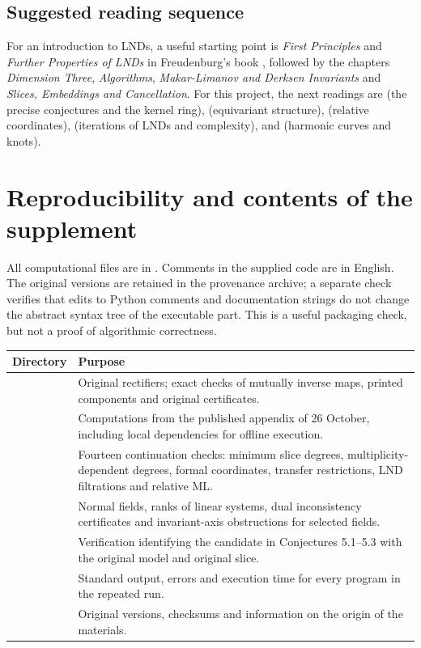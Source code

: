 \subsection*{Suggested reading sequence}
For an introduction to LNDs, a useful starting point is \emph{First Principles}
and \emph{Further Properties of LNDs} in Freudenburg's book \cite{Freudenburg},
followed by the chapters \emph{Dimension Three}, \emph{Algorithms},
\emph{Makar-Limanov and Derksen Invariants} and
\emph{Slices, Embeddings and Cancellation}. For this project,
the next readings are \cite{vdER} (the precise conjectures and the kernel ring),
\cite{Masuda} (equivariant structure), \cite{EVM} (relative
coordinates), \cite{DG} (iterations of LNDs and complexity),
and \cite{FF,KP} (harmonic curves and knots).

\section{Reproducibility and contents of the supplement}

All computational files are in .
Comments in the supplied code are in English. The original
versions are retained in the provenance archive; a separate check verifies
that edits to Python comments and documentation strings do not change
the abstract syntax tree of the executable part.
This is a useful packaging check, but not a proof of algorithmic correctness.

\begin{longtable}{L{0.29\textwidth}L{0.65\textwidth}}
\toprule Directory & Purpose \\ \midrule
\endhead
{} & Original rectifiers; exact checks of mutually inverse
maps, printed components and original certificates.\\[5pt]
 & Computations from the published appendix
of 26 October, including local dependencies for offline execution.\\[5pt]
 & Fourteen continuation checks: minimum slice
degrees, multiplicity-dependent degrees, formal coordinates, transfer
restrictions, LND filtrations and relative ML.\\[5pt]
 & Normal fields, ranks of linear systems, dual
inconsistency certificates and invariant-axis obstructions for selected fields.\\[5pt]
 & Verification identifying the candidate in
Conjectures 5.1--5.3 with the original model and original slice.\\[5pt]
 & Standard output, errors and execution time
for every program in the repeated run.\\[5pt]
 & Original versions, checksums and information
on the origin of the materials.\\
\bottomrule
\end{longtable}

